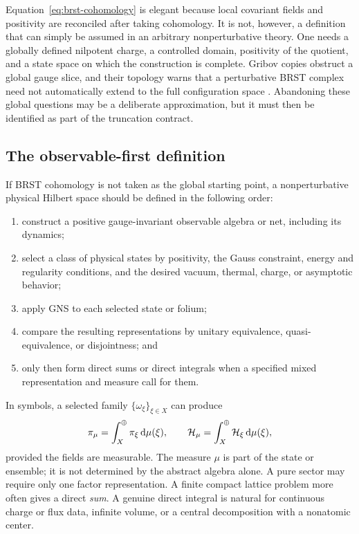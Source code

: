 Equation~\eqref{eq:brst-cohomology} is elegant because local covariant fields
and positivity are reconciled after taking cohomology.  It is not, however, a
definition that can simply be assumed in an arbitrary nonperturbative theory.
One needs a globally defined nilpotent charge, a controlled domain, positivity
of the quotient, and a state space on which the construction is complete.
Gribov copies obstruct a global gauge slice, and their topology warns that a
perturbative BRST complex need not automatically extend to the full
configuration space \cite{Gribov:1978,Singer:1978}.  Abandoning these global
questions may be a deliberate approximation, but it must then be identified
as part of the truncation contract.

\subsection{The observable-first definition}

If BRST cohomology is not taken as the global starting point, a nonperturbative
physical Hilbert space should be defined in the following order:
\begin{enumerate}[label=\arabic*.]
  \item construct a positive gauge-invariant observable algebra or net,
  including its dynamics;
  \item select a class of physical states by positivity, the Gauss constraint,
  energy and regularity conditions, and the desired vacuum, thermal, charge,
  or asymptotic behavior;
  \item apply GNS to each selected state or folium;
  \item compare the resulting representations by unitary equivalence,
  quasi-equivalence, or disjointness; and
  \item only then form direct sums or direct integrals when a specified mixed
  representation and measure call for them.
\end{enumerate}

In symbols, a selected family $\{\omega_\xi\}_{\xi\in X}$ can produce
\begin{equation}
  \pi_\mu
  =\int_X^\oplus\pi_\xi\,\mathrm{d}\mu(\xi),
  \qquad
  \mathcal{H}_\mu
  =\int_X^\oplus\mathcal{H}_\xi\,\mathrm{d}\mu(\xi),
  \label{eq:physical-sector-direct-integral}
\end{equation}
provided the fields are measurable.  The measure $\mu$ is part of the state
or ensemble; it is not determined by the abstract algebra alone.  A pure
sector may require only one factor representation.  A finite compact lattice
problem more often gives a direct \textit{sum}.  A genuine direct integral is
natural for continuous charge or flux data, infinite volume, or a central
decomposition with a nonatomic center.

